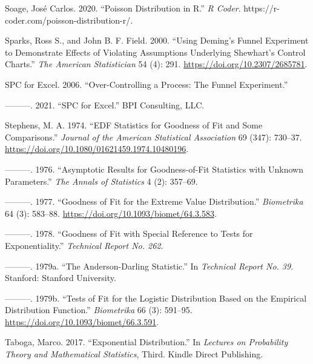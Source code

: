 \documentclass[
]{book}
\newlength{\cslhangindent}
\newenvironment{CSLReferences}[2] %
 {%
  \setlength{\parindent}{0pt}
  \ifodd #1 \everypar{\setlength{\hangindent}{\cslhangindent}}\ignorespaces\fi
  \ifnum #2 > 0
  \setlength{\parskip}{#2\baselineskip}
  \fi
 }%
 {}
\begin{document}
\begin{CSLReferences}{1}{0}
\leavevmode{}%
Soage, José Carlos. 2020. {``Poisson Distribution in {R}.''} \emph{R Coder}. https://r-coder.com/poisson-distribution-r/.

\leavevmode{}%
Sparks, Ross S., and John B. F. Field. 2000. {``Using {Deming}'s {Funnel Experiment} to {Demonstrate Effects} of {Violating Assumptions Underlying Shewhart}'s {Control Charts}.''} \emph{The American Statistician} 54 (4): 291. \url{https://doi.org/10.2307/2685781}.

\leavevmode{}%
SPC for Excel. 2006. {``Over-Controlling a Process: The Funnel Experiment.''}

\leavevmode{}%
---------. 2021. {``{SPC} for Excel.''} {BPI Consulting, LLC}.

\leavevmode{}%
Stephens, M. A. 1974. {``{EDF} Statistics for Goodness of Fit and Some Comparisons.''} \emph{Journal of the American Statistical Association} 69 (347): 730--37. \url{https://doi.org/10.1080/01621459.1974.10480196}.

\leavevmode{}%
---------. 1976. {``Asymptotic Results for Goodness-of-Fit Statistics with Unknown Parameters.''} \emph{The Annals of Statistics} 4 (2): 357--69.

\leavevmode{}%
---------. 1977. {``Goodness of Fit for the Extreme Value Distribution.''} \emph{Biometrika} 64 (3): 583--88. \url{https://doi.org/10.1093/biomet/64.3.583}.

\leavevmode{}%
---------. 1978. {``Goodness of Fit with Special Reference to Tests for Exponentiality.''} \emph{Technical Report No. 262}.

\leavevmode{}%
---------. 1979a. {``The Anderson-Darling Statistic.''} In \emph{Technical Report No. 39}. {Stanford}: {Stanford University}.

\leavevmode{}%
---------. 1979b. {``Tests of Fit for the Logistic Distribution Based on the Empirical Distribution Function.''} \emph{Biometrika} 66 (3): 591--95. \url{https://doi.org/10.1093/biomet/66.3.591}.

\leavevmode{}%
Taboga, Marco. 2017. {``Exponential Distribution.''} In \emph{Lectures on Probability Theory and Mathematical Statistics}, Third. {Kindle Direct Publishing}.


\end{CSLReferences}
\end{document}
